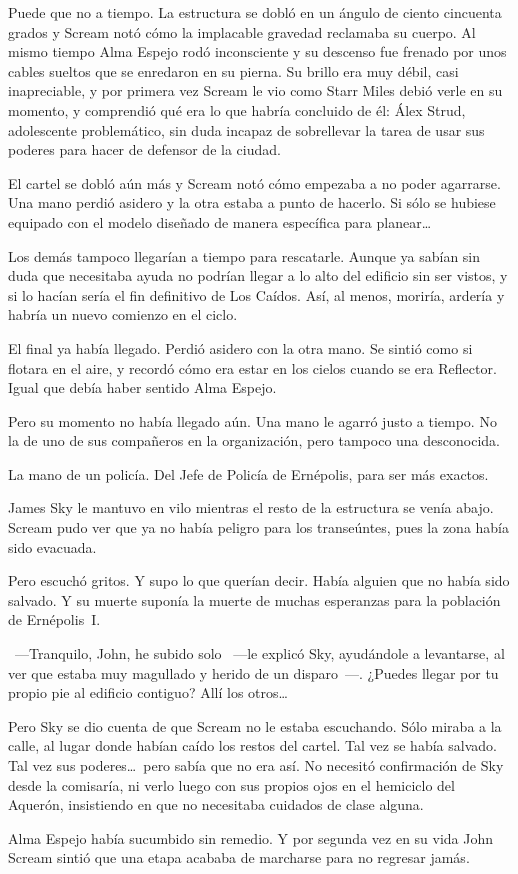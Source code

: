 Puede que no a tiempo. La estructura se dobló en un ángulo de ciento cincuenta grados y Scream notó cómo la implacable gravedad reclamaba su cuerpo. Al mismo tiempo Alma Espejo rodó inconsciente y su descenso fue frenado por unos cables sueltos que se enredaron en su pierna. Su brillo era muy débil, casi inapreciable, y por primera vez Scream le vio como Starr Miles debió verle en su momento, y comprendió qué era lo que habría concluido de él: Álex Strud, adolescente problemático, sin duda incapaz de sobrellevar la tarea de usar sus poderes para hacer de defensor de la ciudad.

El cartel se dobló aún más y Scream notó cómo empezaba a no poder agarrarse. Una mano perdió asidero y la otra estaba a punto de hacerlo. Si sólo se hubiese equipado con el modelo diseñado de manera específica para planear\dots

Los demás tampoco llegarían a tiempo para rescatarle. Aunque ya sabían sin duda que necesitaba ayuda no podrían llegar a lo alto del edificio sin ser vistos, y si lo hacían sería el fin definitivo de Los Caídos. Así, al menos, moriría, ardería y habría un nuevo comienzo en el ciclo.

El final ya había llegado. Perdió asidero con la otra mano. Se sintió como si flotara en el aire, y recordó cómo era estar en los cielos cuando se era Reflector. Igual que debía haber sentido Alma Espejo.

Pero su momento no había llegado aún. Una mano le agarró justo a tiempo. No la de uno de sus compañeros en la organización, pero tampoco una desconocida.

La mano de un policía. Del Jefe de Policía de Ernépolis, para ser más exactos.

James Sky le mantuvo en vilo mientras el resto de la estructura se venía abajo. Scream pudo ver que ya no había peligro para los transeúntes, pues la zona había sido evacuada.

Pero escuchó gritos. Y supo lo que querían decir. Había alguien que no había sido salvado. Y su muerte suponía la muerte de muchas esperanzas para la población de Ernépolis~I.

~---Tranquilo, John, he subido solo ~---le explicó Sky, ayudándole a levantarse, al ver que estaba muy magullado y herido de un disparo~---. ¿Puedes llegar por tu propio pie al edificio contiguo? Allí los otros\dots

Pero Sky se dio cuenta de que Scream no le estaba escuchando. Sólo miraba a la calle, al lugar donde habían caído los restos del cartel. Tal vez se había salvado. Tal vez sus poderes\dots\ pero sabía que no era así. No necesitó confirmación de Sky desde la comisaría, ni verlo luego con sus propios ojos en el hemiciclo del Aquerón, insistiendo en que no necesitaba cuidados de clase alguna.

Alma Espejo había sucumbido sin remedio. Y por segunda vez en su vida John Scream sintió que una etapa acababa de marcharse para no regresar jamás.

\endinput

